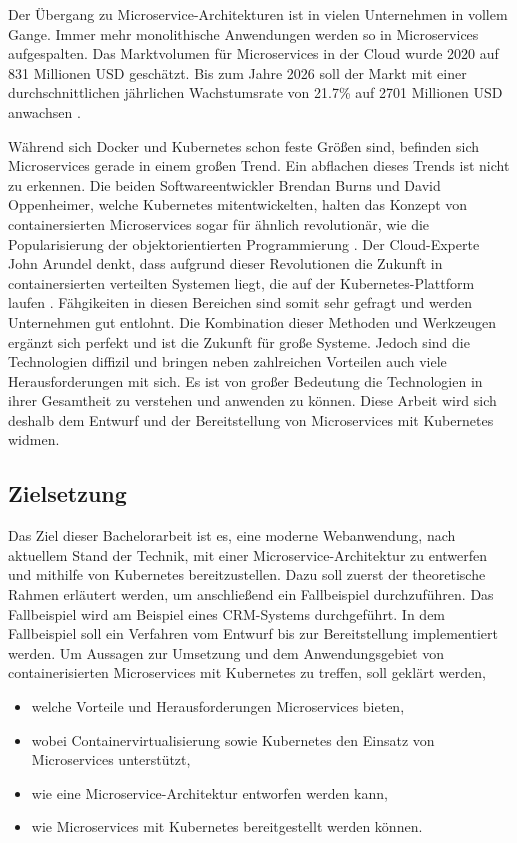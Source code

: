 Der Übergang zu Microservice-Architekturen ist in vielen Unternehmen in vollem Gange. Immer mehr monolithische Anwendungen werden so in Microservices aufgespalten. Das Marktvolumen für Microservices in der Cloud wurde 2020 auf 831 Millionen \ac{USD} geschätzt. Bis zum Jahre 2026 soll der Markt mit einer durchschnittlichen jährlichen Wachstumsrate von 21.7\%  auf 2701 Millionen \ac{USD} anwachsen \parencite[vgl.][S. 7]{mordorintelligenceGlobal2020}.

Während sich Docker und Kubernetes schon feste Größen sind, befinden sich Microservices gerade in einem großen Trend. Ein abflachen dieses Trends ist nicht zu erkennen. Die beiden Softwareentwickler Brendan Burns und David Oppenheimer, welche Kubernetes mitentwickelten, halten das Konzept von containersierten Microservices sogar für ähnlich revolutionär, wie die Popularisierung der objektorientierten Programmierung \parencite[vgl.][S. 1]{burnsDesign2016}. Der Cloud-Experte John Arundel denkt, dass aufgrund dieser Revolutionen die Zukunft in containersierten verteilten Systemen liegt, die auf der Kubernetes-Plattform laufen \parencite[vgl.][S. 1]{arundelCloud2019}. Fähgikeiten in diesen Bereichen sind somit sehr gefragt und werden Unternehmen gut entlohnt. Die Kombination dieser Methoden und Werkzeugen ergänzt sich perfekt und ist die Zukunft für große Systeme. Jedoch sind die Technologien diffizil und bringen neben zahlreichen Vorteilen auch viele Herausforderungen mit sich. Es ist von großer Bedeutung die Technologien in ihrer Gesamtheit zu verstehen und anwenden zu können. Diese Arbeit wird sich deshalb dem Entwurf und der Bereitstellung von Microservices mit Kubernetes widmen.
  
\subsection{Zielsetzung}
Das Ziel dieser Bachelorarbeit ist es, eine moderne Webanwendung, nach aktuellem Stand der Technik, mit einer Microservice-Architektur zu entwerfen und mithilfe von Kubernetes bereitzustellen. Dazu soll zuerst der theoretische Rahmen erläutert werden, um anschließend ein Fallbeispiel durchzuführen. Das Fallbeispiel wird am Beispiel eines \ac{CRM}-Systems durchgeführt. In dem Fallbeispiel soll ein Verfahren vom Entwurf bis zur Bereitstellung implementiert werden. Um Aussagen zur Umsetzung und dem Anwendungsgebiet von containerisierten Microservices mit Kubernetes zu treffen, soll geklärt werden, 

\begin{itemize}
\item welche Vorteile und Herausforderungen Microservices bieten,
\item wobei Containervirtualisierung sowie Kubernetes den Einsatz von Microservices unterstützt,
\item wie eine Microservice-Architektur entworfen werden kann,
\item wie Microservices mit Kubernetes bereitgestellt werden können.
\end{itemize}

